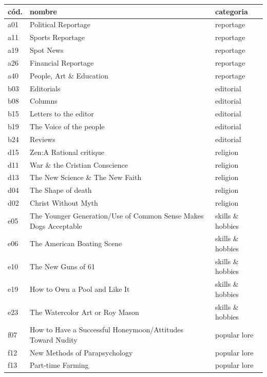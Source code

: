\documentclass[12pt,letterpaper,twoside]{article}
\begin{document}
    \begin{longtable}{| p{} | p{} | p{}|} 
    \hline
        cód.  & nombre  & categoria  \\ \hline
        a01 & Political Reportage & reportage  \\ \hline
        a11 & Sports Reportage & reportage  \\ \hline
        a19 & Spot News & reportage  \\ \hline
        a26 & Financial Reportage & reportage  \\ \hline
        a40 & People, Art \& Education & reportage \\ \hline
        b03 & Editorials & editorial  \\ \hline
        b08 & Columns & editorial  \\ \hline
        b15 & Letters to the editor & editorial  \\ \hline
        b19 & The Voice of the people & editorial \\ \hline
        b24 & Reviews & editorial \\ \hline
        d15 & Zen:A Rational critique & religion  \\ \hline
        d11 & War \& the Cristian Conscience & religion  \\ \hline
        d13 & The New Science \& The New Faith & religion  \\ \hline
        d04 & The Shape of death & religion  \\ \hline
        d02 & Christ Without Myth & religion  \\ \hline
        e05 & The Younger Generation/Use of Common Sense Makes Dogs Acceptable & skills \& hobbies \\ \hline
        e06 & The American Boating Scene & skills \& hobbies  \\ \hline
        e10 & The New Guns of 61 & skills \& hobbies  \\ \hline
        e19 & How to Own a Pool and Like It & skills \& hobbies  \\ \hline
        e23 & The Watercolor Art or Roy Mason & skills \& hobbies  \\ \hline
        f07 & How to Have a Successful Honeymoon/Attitudes Toward Nudity & popular lore  \\ \hline
        f12 & New Methods of Parapsychology & popular lore  \\ \hline
        f13 & Part-time Farming & popular lore  \\ \hline

\end{longtable}
\end{document}
